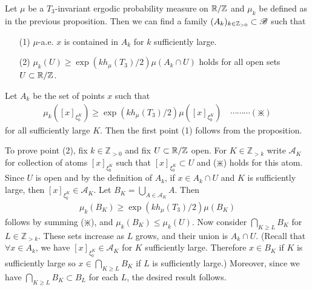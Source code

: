 \documentclass[12pt,a4paper]{report}
\newenvironment{proof}
{\begin{changemargin}{1cm}{0.5cm} 
	}%
	{\end{changemargin}
}
\begin{document}
\cor Let $\mu$ be a $T_3$-invariant ergodic probability measure on $\mathbb{R}/\mathbb{Z}$ and $\mu_k$ be defined as in the previous proposition. Then we can find a family $(A_{k})_{k\in \mathbb{Z}_{>0}} \subset \mathscr{B}$ such that
\begin{itemize}
\item[(1)] $\mu$-a.e. $x$ is contained in $A_k$ for $k$ sufficiently large.
\item[(2)] $\mu_k(U) \geq \exp(k h_{\mu}(T_3)/2) \mu(A_k \cap U)$ holds for all open sets $U\subset \mathbb{R}/\mathbb{Z}$.
\end{itemize}
\begin{proof}
\pf Let $A_k$ be the set of points $x$ such that
\begin{align*}
\mu_k([x]_{\xi_0^K}) \geq \exp(k h_{\mu}(T_3)/2) \mu([x]_{\xi_0^K}) \quad \cdots\cdots\cdots (\divideontimes)
\end{align*}
for all sufficiently large $K$. Then the first point (1) follows from the proposition. 

\quad To prove point (2), fix $k\in \mathbb{Z}_{>0}$ and fix $U\subset \mathbb{R}/\mathbb{Z}$ open. For $K\in \mathbb{Z}_{>k}$ write $\mathscr{A}_K$ for collection of atoms $[x]_{\xi_0^K}$ such that $[x]_{\xi_0^K} \subset U$ and ($\divideontimes$) holds for this atom. Since $U$ is open and by the definition of $A_k$, if $x\in A_k \cap U$ and $K$ is sufficiently large, then $[x]_{\xi_0^K} \in \mathscr{A}_K$. Let $B_K = \bigcup_{A\in \mathscr{A}_K} A$. Then
\begin{align*}
\mu_k(B_K) \geq \exp (k h_{\mu}(T_3)/2) \mu(B_K)
\end{align*}
follows by summing ($\divideontimes$), and $\mu_k(B_K) \leq \mu_k(U)$. Now consider $\bigcap_{K\geq L} B_K$ for $L \in \mathbb{Z}_{>k}$. These sets increase as $L$ grows, and their union is $A_k \cap U$. (Recall that $\forall x\in A_k$, we have $[x]_{\xi_0^K} \in \mathscr{A}_K$ for $K$ sufficiently large. Therefore $x\in B_K$ if $K$ is sufficiently large so $x\in \bigcap_{K \geq L} B_K$ if $L$ is sufficiently large.) Moreover, since we have $\bigcap_{K\geq L} B_K \subset B_L$ for each $L$, the desired result follows.
\s

\eop
\end{proof}
\end{document}
